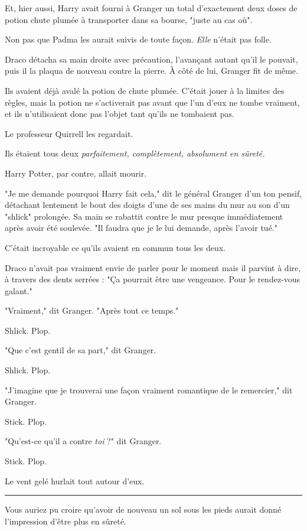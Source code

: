 Et, hier aussi, Harry avait fourni à Granger un total d'exactement deux doses de potion chute plumée à transporter dans sa bourse, "juste au cas où".

Non pas que Padma les aurait suivis de toute façon. \emph{Elle}  n'était pas folle.

Draco détacha sa main droite avec précaution, l'avançant autant qu'il le pouvait, puis il la plaqua de nouveau contre la pierre. À côté de lui, Granger fit de même.

Ils avaient déjà avalé la potion de chute plumée. C'était jouer à la limites des règles, mais la potion ne s'activerait pas avant que l'un d'eux ne tombe vraiment, et ils n'utilisaient donc pas l'objet tant qu'ils ne tombaient pas.

Le professeur Quirrell les regardait.

Ils étaient tous deux \emph{parfaitement, complètement, absolument en sûreté.} 

Harry Potter, par contre, allait mourir.

"Je me demande pourquoi Harry fait cela," dit le général Granger d'un ton pensif, détachant lentement le bout des doigts d'une de ses mains du mur au son d'un "shlick" prolongée. Sa main se rabattit contre le mur presque immédiatement après avoir été soulevée. "Il faudra que je le lui demande, après l'avoir tué."

C'était incroyable ce qu'ils avaient en commun tous les deux.

Draco n'avait pas vraiment envie de parler pour le moment mais il parvint à dire, à travers des dents serrées : "Ça pourrait être une vengeance. Pour le rendez-vous galant."

"Vraiment," dit Granger. "Après tout ce temps."

Shlick. Plop.

"Que c'est gentil de sa part," dit Granger.

Shlick. Plop.

"J'imagine que je trouverai une façon vraiment romantique de le remercier," dit Granger.

Stick. Plop.

"Qu'est-ce qu'il a contre \emph{toi } ?" dit Granger.

Stick. Plop.

Le vent gelé hurlait tout autour d'eux.
\par\noindent\rule{\textwidth}{0.4pt}
Vous auriez pu croire qu'avoir de nouveau un sol sous les pieds aurait donné l'impression d'être plus en sûreté.

